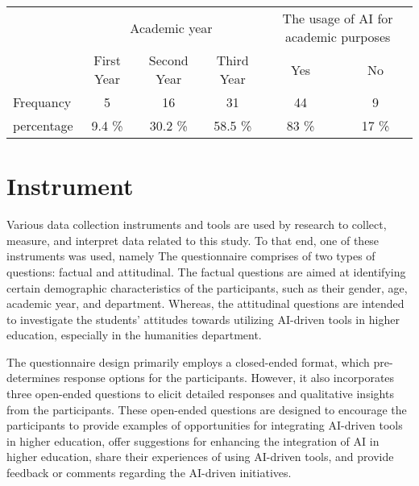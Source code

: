 \begin{table}[H]
	\begin{tabular}{l|ccc|cc|}
		\cline{2-6}
		\multirow{2}{*}{}                & \multicolumn{3}{c|}{Academic year} & \multicolumn{2}{c|}{The usage of AI for academic purposes}                                                                                             \\ \cline{2-6}
		                                 & \multicolumn{1}{c|}{First Year}    & \multicolumn{1}{c|}{Second Year}                         & \multicolumn{1}{c|}{Third Year} & \multicolumn{1}{c|}{Yes}   & \multicolumn{1}{c|}{No}    \\ \hline
		\multicolumn{1}{|l|}{Frequancy}  & \multicolumn{1}{c|}{5}             & \multicolumn{1}{c|}{16}                                  & \multicolumn{1}{c|}{31}         & \multicolumn{1}{c|}{44}    & \multicolumn{1}{c|}{9}     \\ \hline
		\multicolumn{1}{|l|}{percentage} & \multicolumn{1}{c|}{9.4 \%}        & \multicolumn{1}{c|}{30.2 \%}                             & \multicolumn{1}{c|}{58.5 \%}    & \multicolumn{1}{c|}{83 \%} & \multicolumn{1}{c|}{17 \%} \\ \hline
	\end{tabular}
\end{table}


\section{Instrument}
\justifying

Various data collection instruments and tools are used by research to collect, measure, and interpret data related to this study.
To that end, one of these instruments was used, namely  The questionnaire comprises of two types
of questions: factual and attitudinal. The factual questions are aimed at identifying certain demographic characteristics
of the participants, such as their gender, age, academic year, and department. Whereas, the attitudinal questions
are intended to investigate the students' attitudes towards utilizing AI-driven tools in higher education,
especially in the humanities department.


The questionnaire design primarily employs a closed-ended format, which pre-determines response
options for the participants. However, it also incorporates three open-ended questions to elicit
detailed responses and qualitative insights from the participants. These open-ended questions are
designed to encourage the participants to provide examples of opportunities for integrating AI-driven
tools in higher education, offer suggestions for enhancing the integration of AI in higher education,
share their experiences of using AI-driven tools, and provide feedback or comments regarding the AI-driven initiatives.


